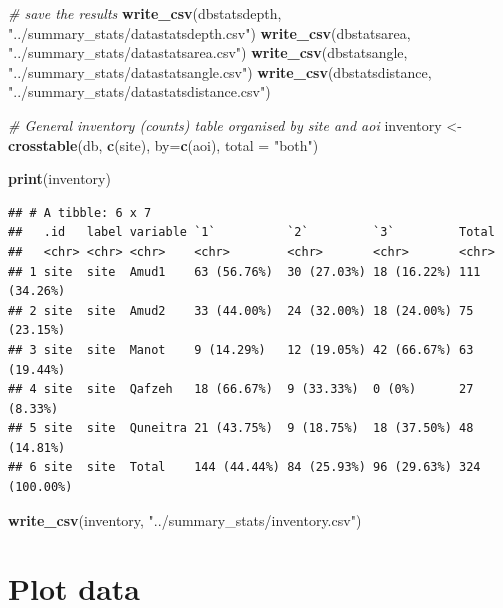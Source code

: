 \documentclass[
]{article}
\newenvironment{Shaded}{\begin{snugshade}}{\end{snugshade}}
\newcommand{\AttributeTok}[1]{\textcolor[rgb]{0.13,0.29,0.53}{#1}}
\newcommand{\CommentTok}[1]{\textcolor[rgb]{0.56,0.35,0.01}{\textit{#1}}}
\newcommand{\FunctionTok}[1]{\textcolor[rgb]{0.13,0.29,0.53}{\textbf{#1}}}
\newcommand{\NormalTok}[1]{#1}
\newcommand{\OtherTok}[1]{\textcolor[rgb]{0.56,0.35,0.01}{#1}}
\newcommand{\StringTok}[1]{\textcolor[rgb]{0.31,0.60,0.02}{#1}}
\begin{document}
\begin{Shaded}
\begin{Highlighting}[]
\CommentTok{\# save the results }
\FunctionTok{write\_csv}\NormalTok{(dbstatsdepth, }\StringTok{"../summary\_stats/datastatsdepth.csv"}\NormalTok{)}
\FunctionTok{write\_csv}\NormalTok{(dbstatsarea, }\StringTok{"../summary\_stats/datastatsarea.csv"}\NormalTok{)}
\FunctionTok{write\_csv}\NormalTok{(dbstatsangle, }\StringTok{"../summary\_stats/datastatsangle.csv"}\NormalTok{)}
\FunctionTok{write\_csv}\NormalTok{(dbstatsdistance, }\StringTok{"../summary\_stats/datastatsdistance.csv"}\NormalTok{)}

\CommentTok{\# General inventory (counts) table organised by site and aoi}
\NormalTok{inventory }\OtherTok{\textless{}{-}} \FunctionTok{crosstable}\NormalTok{(db, }\FunctionTok{c}\NormalTok{(site), }\AttributeTok{by=}\FunctionTok{c}\NormalTok{(aoi), }\AttributeTok{total =} \StringTok{"both"}\NormalTok{)}

\FunctionTok{print}\NormalTok{(inventory)}
\end{Highlighting}
\end{Shaded}

\begin{verbatim}
## # A tibble: 6 x 7
##   .id   label variable `1`          `2`         `3`         Total        
##   <chr> <chr> <chr>    <chr>        <chr>       <chr>       <chr>        
## 1 site  site  Amud1    63 (56.76%)  30 (27.03%) 18 (16.22%) 111 (34.26%) 
## 2 site  site  Amud2    33 (44.00%)  24 (32.00%) 18 (24.00%) 75 (23.15%)  
## 3 site  site  Manot    9 (14.29%)   12 (19.05%) 42 (66.67%) 63 (19.44%)  
## 4 site  site  Qafzeh   18 (66.67%)  9 (33.33%)  0 (0%)      27 (8.33%)   
## 5 site  site  Quneitra 21 (43.75%)  9 (18.75%)  18 (37.50%) 48 (14.81%)  
## 6 site  site  Total    144 (44.44%) 84 (25.93%) 96 (29.63%) 324 (100.00%)
\end{verbatim}

\begin{Shaded}
\begin{Highlighting}[]
\FunctionTok{write\_csv}\NormalTok{(inventory, }\StringTok{"../summary\_stats/inventory.csv"}\NormalTok{)}
\end{Highlighting}
\end{Shaded}

\hypertarget{plot-data}{%
\section{Plot data}\label{plot-data}}
\end{document}
